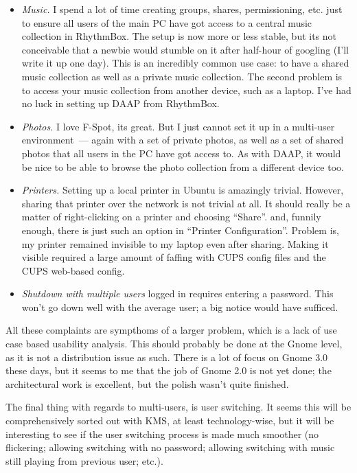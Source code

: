 \documentclass{memoir}
\begin{document}
\begin{itemize}
\item \emph{Music.} I spend a lot of time creating groups, shares,
  permissioning, etc. just to ensure all users of the main PC have got
  access to a central music collection in RhythmBox. The setup is now
  more or less stable, but its not conceivable that a newbie would
  stumble on it after half-hour of googling (I'll write it up one
  day). This is an incredibly common use case: to have a shared music
  collection as well as a private music collection. The second problem
  is to access your music collection from another device, such as a
  laptop. I've had no luck in setting up DAAP from RhythmBox.
\item \emph{Photos.} I love F-Spot, its great. But I just cannot set
  it up in a multi-user environment~--- again with a set of private
  photos, as well as a set of shared photos that all users in the PC
  have got access to. As with DAAP, it would be nice to be able to
  browse the photo collection from a different device too.
\item \emph{Printers.} Setting up a local printer in Ubuntu is
  amazingly trivial. However, sharing that printer over the network is
  not trivial at all. It should really be a matter of right-clicking
  on a printer and choosing ``Share''. and, funnily enough, there is
  just such an option in ``Printer Configuration''. Problem is, my
  printer remained invisible to my laptop even after sharing. Making
  it visible required a large amount of faffing with CUPS config files
  and the CUPS web-based config.
\item \emph{Shutdown with multiple users} logged in requires entering
  a password. This won't go down well with the average user; a big
  notice would have sufficed.
\end{itemize}

All these complaints are sympthoms of a larger problem, which is a
lack of use case based usability analysis. This should probably be
done at the Gnome level, as it is not a distribution issue as
such. There is a lot of focus on Gnome 3.0 these days, but it seems to
me that the job of Gnome 2.0 is not yet done; the architectural work
is excellent, but the polish wasn't quite finished.

The final thing with regards to multi-users, is user switching. It
seems this will be comprehensively sorted out with KMS, at least
technology-wise, but it will be interesting to see if the user
switching process is made much smoother (no flickering; allowing
switching with no password; allowing switching with music still
playing from previous user; etc.).
\end{document}
